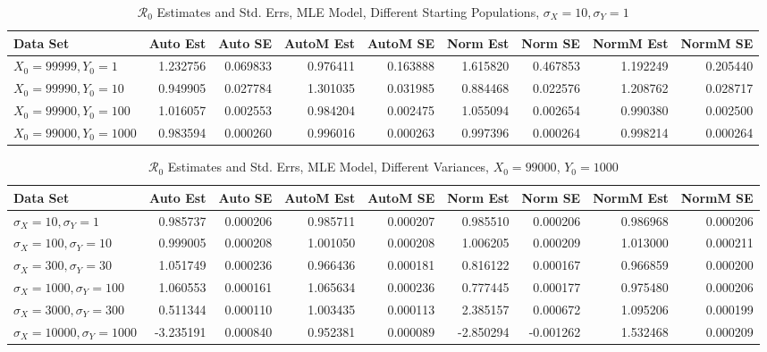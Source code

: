 \documentclass[12pt]{article}
\newcommand{\rr}{\ensuremath{\mathcal{R}_0}}
\begin{document}
\begin{table}[H]
	
	\caption{$\rr$ Estimates and Std. Errs, MLE Model,
		Different Starting Populations, 
		$\sigma_X = 10, \sigma_Y = 1$}
	\begin{footnotesize}
		\hskip -1.7cm
		\begin{tabular}{l|r|r|r|r|r|r|r|r}
			\hline
			Data Set & Auto Est & Auto SE & AutoM Est & AutoM SE & Norm Est & Norm SE & NormM Est & NormM SE\\
			\hline
			$X_0 = 99999, Y_0 = 1$ & 1.232756 & 0.069833 & 0.976411 & 0.163888 & 1.615820 & 0.467853 & 1.192249 & 0.205440\\
			\hline
			$X_0 = 99990, Y_0 = 10$ & 0.949905 & 0.027784 & 1.301035 & 0.031985 & 0.884468 & 0.022576 & 1.208762 & 0.028717\\
			\hline
			$X_0 = 99900, Y_0 = 100$ & 1.016057 & 0.002553 & 0.984204 & 0.002475 & 1.055094 & 0.002654 & 0.990380 & 0.002500\\
			\hline
			$X_0 = 99000, Y_0 = 1000$ & 0.983594 & 0.000260 & 0.996016 & 0.000263 & 0.997396 & 0.000264 & 0.998214 & 0.000264\\
			\hline
		\end{tabular}
	\end{footnotesize}
\end{table}


\begin{table}[H]
	
	\caption{$\rr$ Estimates and Std. Errs, MLE Model, 
		Different Variances, $X_0 = 99000$, $Y_0 = 1000$}
	\begin{footnotesize}
		\hskip -1.7cm
		\begin{tabular}{l|r|r|r|r|r|r|r|r}
			\hline
			Data Set & Auto Est & Auto SE & AutoM Est & AutoM SE & Norm Est & Norm SE & NormM Est & NormM SE\\
			\hline
			$\sigma_X = 10, \sigma_Y = 1$ & 0.985737 & 0.000206 & 0.985711 & 0.000207 & 0.985510 & 0.000206 & 0.986968 & 0.000206\\
			\hline
			$\sigma_X = 100, \sigma_Y = 10$ & 0.999005 & 0.000208 & 1.001050 & 0.000208 & 1.006205 & 0.000209 & 1.013000 & 0.000211\\
			\hline
			$\sigma_X = 300, \sigma_Y = 30$ & 1.051749 & 0.000236 & 0.966436 & 0.000181 & 0.816122 & 0.000167 & 0.966859 & 0.000200\\
			\hline
			$\sigma_X = 1000, \sigma_Y = 100$ & 1.060553 & 0.000161 & 1.065634 & 0.000236 & 0.777445 & 0.000177 & 0.975480 & 0.000206\\
			\hline
			$\sigma_X = 3000, \sigma_Y = 300$ & 0.511344 & 0.000110 & 1.003435 & 0.000113 & 2.385157 & 0.000672 & 1.095206 & 0.000199\\
			\hline
			$\sigma_X = 10000, \sigma_Y = 1000$ & -3.235191 & 0.000840 & 0.952381 & 0.000089 & -2.850294 & -0.001262 & 1.532468 & 0.000209\\
			\hline
		\end{tabular}
	\end{footnotesize}
\end{table}
\end{document}
